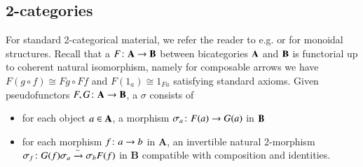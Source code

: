 \documentclass[reqno]{amsart}
\begin{document}
\subsection{2-categories}\label{sec:2cats}
For standard 2-categorical material, we refer the reader to e.g. \cite{KS} or \cite{DS} for monoidal structures. %
Recall that a  $F\colon\mathbf{A}\to\mathbf{B}$ between bicategories $\mathbf{A}$ and $\mathbf{B}$ is functorial up to coherent natural isomorphism, namely for composable arrows we have $F(g\circ f)\cong Fg\circ Ff$ and $F(1_a)\cong1_{Fa}$ satisfying standard axioms. 
Given pseudofunctors $F,G\colon \mathbf{A} \to \mathbf{B}$, a  $\sigma$ consists of
\begin{itemize}
\item for each object $a \in \mathbf{A}$, a morphism $\sigma_a \colon F(a) \to G(a)$ in $\mathbf{B}$ 
\item 
for each morphism $f \colon a \to b$ in $\mathbf{A}$, an invertible natural 2-morphism $\sigma_f \colon G(f) \sigma_a \xrightarrow{\sim} \sigma_{b} F(f)$ in $\mathbf{B}$
compatible with composition and identities.
\end{itemize}
\end{document}
